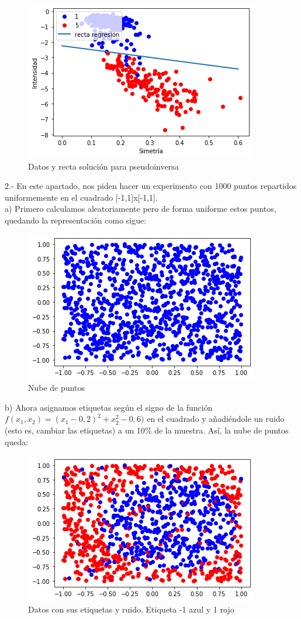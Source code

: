 \documentclass[12pt]{article}
\begin{document}
\begin{figure}[H]
\centering
\includegraphics[scale=0.75]{Images/Pseudoinversa.png} 
\caption{Datos y recta solución para pseudoinversa}
\label{etiqueta}
\end{figure}
2.- En este apartado, nos piden hacer un experimento con 1000 puntos repartidos uniformemente en el cuadrado [-1,1]x[-1,1].\\
a) Primero calculamos aleatoriamente pero de forma uniforme estos puntos, quedando la representación como sigue:
\begin{figure}[H]
\centering
\includegraphics[scale=0.65]{Images/1000N1.png} 
\caption{Nube de puntos}
\label{etiqueta}
\end{figure}
b) Ahora asignamos etiquetas según el signo de la función $f(x_{1},x_{2})=(x_{1} - 0,2)^{2} + x _{2}^{2} - 0,6)$ en el cuadrado y añadiéndole un ruido (esto es, cambiar las etiquetas) a un 10$\%$ de la muestra. Así, la nube de puntos queda:
\begin{figure}[H]
\centering
\includegraphics[scale=0.65]{Images/1000N2.png} 
\caption{Datos con sus etiquetas y ruido. Etiqueta -1 azul y 1 rojo}
\label{etiqueta}
\end{figure}
\end{document}
